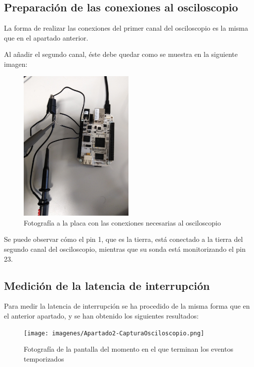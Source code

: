 \documentclass[../main.tex]{subfiles}
\begin{document}
\subsection{Preparación de las conexiones al osciloscopio}

La forma de realizar las conexiones del primer canal del osciloscopio es la misma que en el apartado anterior. 

Al añadir el segundo canal, éste debe quedar como se muestra en la siguiente imagen:

\begin{figure}[h]
\centering
\includegraphics[width=0.5\textwidth]{imagenes/Apartado2-FotografiaPlaca.jpg}
\caption{Fotografía a la placa con las conexiones necesarias al osciloscopio}
\end{figure}

Se puede observar cómo el pin 1, que es la tierra, está conectado a la tierra del segundo canal del osciloscopio, mientras que su sonda está monitorizando el pin 23.

\subsection{Medición de la latencia de interrupción}

Para medir la latencia de interrupción se ha procedido de la misma forma que en el anterior apartado, y se han obtenido los siguientes resultados:

\clearpage %

\begin{figure}[h]
\centering
\texttt{[image: imagenes/Apartado2-CapturaOsciloscopio.png]}
\caption{Fotografía de la pantalla del momento en el que terminan los eventos temporizados}
\end{figure}
\end{document}
